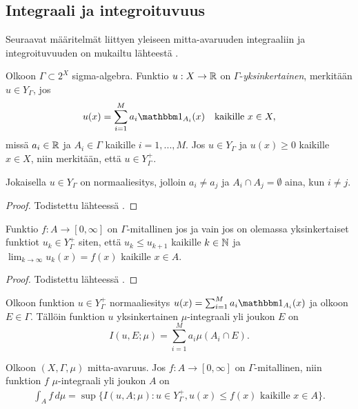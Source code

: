 \documentclass[12pt,oneside,a4paper]{amsbook} %
\begin{document}
\subsection{Integraali ja integroituvuus}
Seuraavat määritelmät liittyen yleiseen mitta-avaruuden integraaliin ja integroituvuuden on mukailtu lähteestä \cite[s. 110-111]{lehrbäck}. 
\begin{definition}
    Olkoon $\Gamma \subset 2^X$ sigma-algebra. Funktio $u: X \to \mathbb{R}$ on $\Gamma$-\textit{yksinkertainen}, merkitään $u \in Y_\Gamma$, jos
    \begin{align*}
        u(x) = \sum_{i=1}^M a_i \indfct{A_i}(x) \quad \text{kaikille } x \in X,
    \end{align*}
    missä $a_i \in \mathbb{R}$ ja $A_i \in \Gamma$ kaikille $i = 1, ..., M.$ Jos $u \in Y_\Gamma$ ja $u(x) \ge 0$ kaikille $x \in X$, niin merkitään, että $u \in Y_\Gamma^+$.
\end{definition}

\begin{lemma}
    Jokaisella $u \in Y_\Gamma$ on normaaliesitys, jolloin $a_i \ne a_j$ ja $A_i \cap A_j = \emptyset$ aina, kun $i \ne j$.
\end{lemma}
\begin{proof}
    Todistettu lähteessä \cite[s. 110]{lehrbäck}.
\end{proof}

\begin{lemma}
    Funktio $f: A \to [0, \infty]$ on $\Gamma$-mitallinen jos ja vain jos on olemassa yksinkertaiset funktiot $u_k \in Y_\Gamma^+$ siten, että $u_k \le u_{k+1}$ kaikille $k \in \mathbb{N}$ ja $\lim_{k\to\infty}u_k(x) = f(x)$ kaikille $x \in A$.
\end{lemma}
\begin{proof}
    Todistettu lähteessä \cite[s. 110]{lehrbäck}.
\end{proof}

\begin{definition}
    Olkoon funktion $u \in Y_\Gamma^+$ normaaliesitys $u(x) = \sum_{i=1}^M a_i\indfct{A_i}(x)$ ja olkoon $E \in \Gamma$. Tällöin funktion $u$ yksinkertainen $\mu$-integraali yli joukon $E$ on
    \begin{equation*}
        I(u, E; \mu) = \sum_{i=1}^M a_i \mu(A_i \cap E).
    \end{equation*}
\end{definition}

\begin{definition}
    Olkoon $(X, \Gamma, \mu)$ mitta-avaruus. Jos $f: A \to [0, \infty]$ on $\Gamma$-mitallinen, niin funktion $f$ $\mu$-integraali yli joukon $A$ on
    \begin{align*}
        \int_A f \, d\mu = \sup\{I(u, A; \mu) : u \in Y_\Gamma^+, u(x) \le f(x) \text{ kaikille } x \in A\}.
    \end{align*}
\end{definition}
\end{document}
